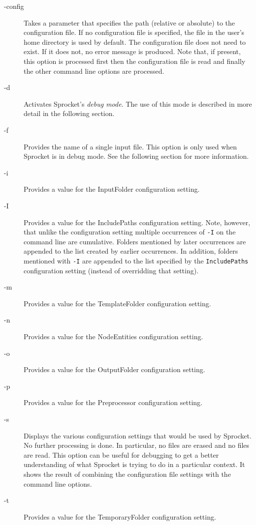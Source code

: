 \begin{description}

\item[-config] Takes a parameter that specifies the path (relative or absolute) to the
configuration file. If no configuration file is specified, the file  in the
user's home directory is used by default. The configuration file does not need to exist. If it
does not, no error message is produced. Note that, if present, this option is processed first
then the configuration file is read and finally the other command line options are processed.

\item[-d] Activates Sprocket's \textit{debug mode}. The use of this mode is described in more
detail in the following section.

\item[-f] Provides the name of a single input file. This option is only used when Sprocket is in
debug mode. See the following section for more information.

\item[-i] Provides a value for the InputFolder configuration setting.

\item[-I] Provides a value for the IncludePaths configuration setting. Note, however, that
unlike the configuration setting multiple occurrences of \texttt{-I} on the command line are
cumulative. Folders mentioned by later occurrences are appended to the list created by earlier
occurrences. In addition, folders mentioned with \texttt{-I} are appended to the list specified
by the \texttt{IncludePaths} configuration setting (instead of overridding that setting).

\item[-m] Provides a value for the TemplateFolder configuration setting.

\item[-n] Provides a value for the NodeEntities configuration setting.

\item[-o] Provides a value for the OutputFolder configuration setting.

\item[-p] Provides a value for the Preprocessor configuration setting.

\item[-s] Displays the various configuration settings that would be used by Sprocket. No further
processing is done. In particular, no files are erased and no files are read. This option can be
useful for debugging to get a better understanding of what Sprocket is trying to do in a
particular context. It shows the result of combining the configuration file settings with the
command line options.

\item[-t] Provides a value for the TemporaryFolder configuration setting.

\end{description}

